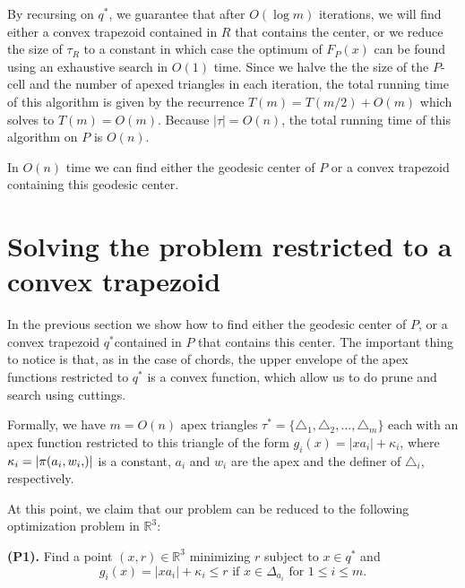 \documentclass[a4paper,UKenglish]{lipics}
\newcommand{\F}[2]{\ensuremath{F_{\scriptscriptstyle #1}(#2)}}
\newcommand{\g}[2]{\ensuremath{|\pi(#1, #2)|}}
\begin{document}
By recursing on $q^*$, we guarantee that after $O(\log m)$ iterations, we will find either a convex trapezoid contained in $R$ that contains the center, or we reduce the size of $\tau_R$ to a constant in which case the optimum of $\F{P}{x}$ can be found using an exhaustive search in $O(1)$ time. Since we halve the the size of the $P$-cell and the number of apexed triangles in each iteration, the total running time of this algorithm is given by the recurrence $T(m) = T(m/2) + O(m)$ which solves to $T(m) = O(m)$. 
Because $|\tau| = O(n)$, the total running time of this algorithm on $P$ is $O(n)$.

\begin{lemma}\label{lemma:Finding the convex trapezoid}
In $O(n)$ time we can find either the geodesic center of $P$ or a convex trapezoid containing this geodesic center.
\end{lemma}


\section{Solving the problem restricted to a convex trapezoid}
In the previous section we show how to find either the geodesic center of $P$, or a convex trapezoid $q^*$contained in $P$ that contains this center. The important thing to notice is that, as in the case of chords, the upper envelope of the apex functions restricted to $q^*$ is a convex function, which allow us to do prune and search using cuttings.

Formally, we have $m = O(n)$ apex triangles $\tau^* = \{\triangle_{1}, \triangle_{2}, \ldots, \triangle_{m}\}$ each with an apex function restricted to this triangle of the form $g_i(x) = |x a_i| + \kappa_i$, where $\kappa_i = \g{a_i, w_i}$ is a constant, $a_i$ and $w_i$ are the apex and the definer of $\triangle_i$, respectively.

At this point, we claim that our problem can be reduced to the following optimization problem in $\mathbb{R}^3$:

\textbf{(P1).} Find a point $(x,r)\in \mathbb{R}^3$ minimizing $r$ subject to $x\in q^*$ and
$$\text{$g_i(x) = |x a_i| + \kappa_i \leq r$ if $x\in \Delta_{a_i}$ for $1\leq i \leq m$}.$$
\end{document}

